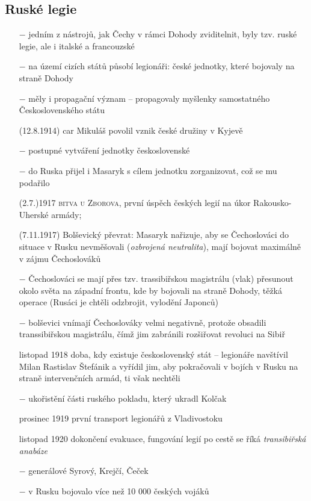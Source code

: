 \documentclass{article}
\begin{document}
\subsection*{Ruské legie}
\begin{itemize}
    \vspace{-0.5em}
    \setlength\itemsep{0.15em}
    \item[$-$] jedním z nástrojů, jak Čechy v rámci Dohody zviditelnit, byly tzv. ruské legie, ale i italské a francouzské
    \item[$-$] na území cizích států působí legionáři: české jednotky, které bojovaly na straně Dohody
    \item[$-$] měly i propagační význam -- propagovaly myšlenky samostatného Československého státu
    \item[(12.8.1914)] car Mikuláš povolil vznik české družiny v Kyjevě
    \item[$-$] postupné vytváření jednotky československé
    \item[$-$] do Ruska přijel i Masaryk s cílem jednotku zorganizovat, což se mu podařilo
    \item[(2.7.)1917] \textsc{bitva u Zborova}, první úspěch českých legií na úkor Rakousko-Uherské armády;
    \item[(7.11.1917)] Bolševický převrat: Masaryk nařizuje, aby se Čechoslováci do situace v Rusku nevměšovali (\textit{ozbrojená neutralita}), mají bojovat maximálně v zájmu Čechoslováků
    \item[$-$] Čechoslováci se mají přes tzv. trassibiřskou magistrálu (vlak) přesunout okolo světa na západní frontu, kde by bojovali na straně Dohody, těžká operace (Rusáci je chtěli odzbrojit, vylodění Japonců)
    \item[$-$] bolševici vnímají Čechoslováky velmi negativně, protože obsadili transsibiřskou magistrálu, čímž jim zabránili rozšiřovat revoluci na Sibiř
    \item[listopad 1918] doba, kdy existuje československý stát -- legionáře navštívil Milan Rastislav Štefánik a vyřídil jim, aby pokračovali v bojích v Rusku na straně intervenčních armád, ti však nechtěli
    \item[$-$] ukořistění části ruského pokladu, který ukradl Kolčak
    \item[prosinec 1919] první transport legionářů z Vladivostoku
    \item[listopad 1920] dokončení evakuace, fungování legií po cestě se říká \textit{transibiřská anabáze}
    \item[$-$] generálové Syrový, Krejčí, Čeček
    \item[$-$] v Rusku bojovalo více než 10 000 českých vojáků
\end{itemize}
\end{document}

